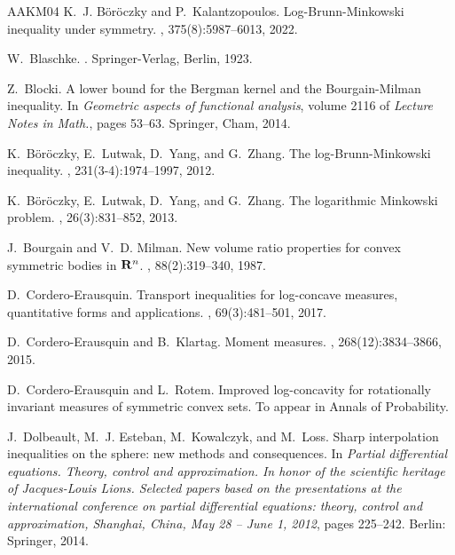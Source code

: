 \documentclass[10pt]{amsart}
\theoremstyle{definition}
\theoremstyle{remark}
\begin{document}
\begin{thebibliography}{AAKM04}
K.~J. B\"{o}r\"{o}czky and P.~Kalantzopoulos.
\newblock Log-{B}runn-{M}inkowski inequality under symmetry.
, 375(8):5987--6013, 2022.

W.~Blaschke.
.
\newblock Springer-Verlag, Berlin, 1923.

Z.~Blocki.
\newblock A lower bound for the {B}ergman kernel and the {B}ourgain-{M}ilman
  inequality.
\newblock In {\em Geometric aspects of functional analysis}, volume 2116 of
  {\em Lecture Notes in Math.}, pages 53--63. Springer, Cham, 2014.

K.~B{\"o}r{\"o}czky, E.~Lutwak, D.~Yang, and G.~Zhang.
\newblock The log-{Brunn}-{Minkowski} inequality.
, 231(3-4):1974--1997, 2012.

K.~B\"{o}r\"{o}czky, E.~Lutwak, D.~Yang, and G.~Zhang.
\newblock The logarithmic {M}inkowski problem.
, 26(3):831--852, 2013.

J.~Bourgain and V.~D. Milman.
\newblock New volume ratio properties for convex symmetric bodies in {${\bf
  R}^n$}.
, 88(2):319--340, 1987.

D.~Cordero-Erausquin.
\newblock Transport inequalities for log-concave measures, quantitative forms
  and applications.
, 69(3):481--501, 2017.

D.~Cordero-Erausquin and B.~Klartag.
\newblock Moment measures.
, 268(12):3834--3866, 2015.

D.~Cordero-Erausquin and L.~Rotem.
\newblock Improved log-concavity for rotationally invariant measures of
  symmetric convex sets.
\newblock To appear in Annals of Probability.

J.~Dolbeault, M.~J. Esteban, M.~Kowalczyk, and M.~Loss.
\newblock Sharp interpolation inequalities on the sphere: new methods and
  consequences.
\newblock In {\em Partial differential equations. Theory, control and
  approximation. In honor of the scientific heritage of Jacques-Louis Lions.
  Selected papers based on the presentations at the international conference on
  partial differential equations: theory, control and approximation, Shanghai,
  China, May 28 -- June 1, 2012}, pages 225--242. Berlin: Springer, 2014.


\end{thebibliography}
\end{document}
